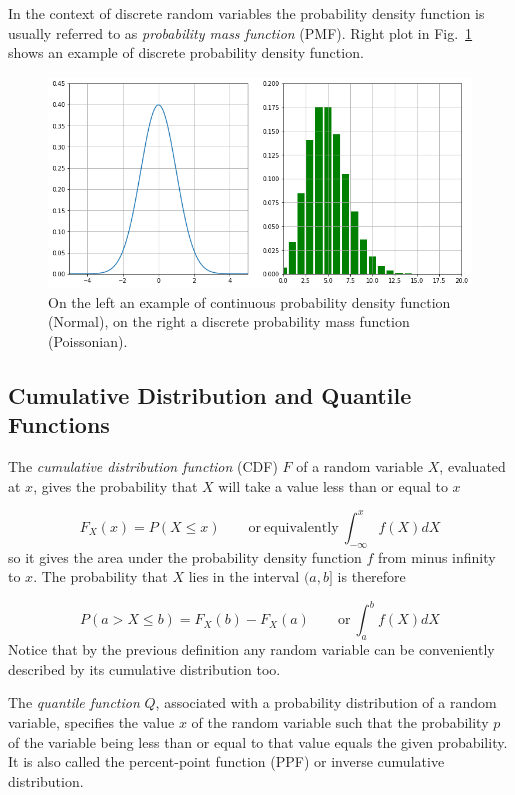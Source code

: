 In the context of discrete random variables the probability density function is usually referred to as \emph{probability mass function} (PMF). Right plot in Fig.~\ref{fig:pdf_pmf} shows an example of discrete probability density function.

\begin{figure}[htb]
	\centering
	\includegraphics[width=1.\textwidth]{figures/pdf_pmf.png}
	\caption{On the left an example of continuous probability density function (Normal), on the right a discrete probability mass function (Poissonian).}
	\label{fig:pdf_pmf}
\end{figure}

\subsection{Cumulative Distribution and Quantile Functions}
\label{sec:quantile-function}

The \emph{cumulative distribution function} (CDF) $F$ of a random variable $X$, evaluated at $x$, gives the probability that $X$ will take a value less than or equal to $x$

\begin{equation}
F_X(x) = P(X \le x)\qquad\mathrm{or~equivalently}~\int_{-\infty}^{x}{f(X)dX}
\end{equation}
so it gives the area under the probability density function $f$ from minus infinity to $x$.
The probability that $X$ lies in the interval $(a,b]$ is therefore

\begin{equation}
P(a> X \le b)=F_{X}(b)-F_{X}(a)\qquad\mathrm{or}~\int_a^b{f(X)dX}
\end{equation}
Notice that by the previous definition any random variable can be conveniently described by its cumulative distribution too.

The \emph{quantile function} $Q$, associated with a probability distribution of a random variable, specifies the value $x$ of the random variable such that the probability $p$ of the variable being less than or equal to that value equals the given probability. It is also called the percent-point function (PPF) or inverse cumulative distribution.

